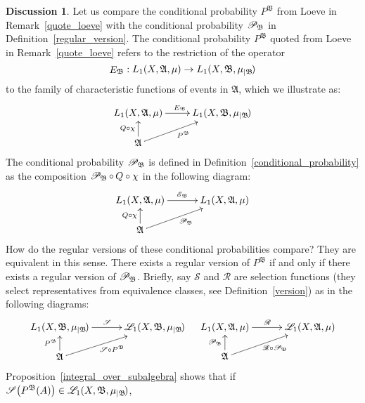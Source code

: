 \documentclass[
twoside=true,
paper=letter,
fontsize=11pt,
pagesize=auto,
leqno,
openany,
headsepline,
overfullrule,
]{scrbook}
\theoremstyle{plain}
\theoremstyle{plain}
\theoremstyle{definition}
\newtheorem{discussion}[thm]{Discussion}
\theoremstyle{bfnoteitalic}
\theoremstyle{bfnoteroman}
\newcommand{\sigalg}[1]{\mathfrak{#1}}
\newcommand{\cali}[1]{\mathscr{#1}}
\newcommand{\kondexpop}{\mathop{E}}
\newcommand{\condexpop}[1]{\mathop{\cali{E}\hspace{-1pt}}\nolimits_{#1}}
\newcommand{\condprobop}[1]{\mathop{\cali{P}\hspace{-1pt}}\nolimits_{#1}}
\newcommand{\restrictedto}[1]{_{\lvert#1}\kern-1.5pt}
\newcommand{\sigmaalgebra}{\sigalg{A}}
\newcommand{\sigmaalgebraii}{\sigalg{B}}
\newcommand{\Lone}{L_1(\measurespace, \sigmaalgebra, \measure)}
\newcommand{\caliLone}{\cali{L}_1(\measurespace, \sigmaalgebra, \measure)}
\newcommand{\measurespace}{X}
\newcommand{\measure}{\mu}
\newcommand{\seti}{A}
\newcommand{\regular}{\cali{R}}
\begin{document}
\begin{discussion}\label{regular_version_equivalence}
Let us compare the conditional probability $P^{\sigalg{B}}$ from Loeve in Remark~\ref{quote_loeve} with the conditional probability $\condprobop{\sigmaalgebraii}$ in Definition~\ref{regular_version}.  The conditional probability
$P^{\sigalg{B}}$ quoted from Loeve in Remark~\ref{quote_loeve} refers to the restriction of the operator
\[
\kondexpop\nolimits_{\sigmaalgebraii}
:
L_1(\measurespace, \sigmaalgebra,\measure) \to
L_1(\measurespace, \sigmaalgebraii,\measure\restrictedto{\sigmaalgebraii})
\]
to the family of characteristic functions of events in $\sigmaalgebra$, which we illustrate as:
\[
\xymatrix@R=16pt{
L_1(\measurespace, \sigmaalgebra,\measure )
\ar[r]^{\kondexpop\nolimits_{\sigmaalgebraii}}
&
L_1(\measurespace, \sigmaalgebraii,\measure\restrictedto{\sigmaalgebraii})
\\
\sigmaalgebra
\ar[u]^{Q\circ\chi}
\ar[ur]_{P^{\sigalg{B}}}
}
\]
The conditional probability $\condprobop{\sigmaalgebraii}$ is defined in Definition~\ref{conditional_probability} as the composition
$\condprobop{\sigmaalgebraii} \circ\, Q \circ\chi$
in the following diagram:
\[
\xymatrix@R=16pt@C=30pt{
\Lone \ar[r]^{\condexpop{\sigmaalgebraii}} & \Lone\\
\sigmaalgebra \ar[u]^{Q\circ\chi} \ar[ur]_{\condprobop{\sigmaalgebraii}} & \\
}
\]
How do the regular versions of these  conditional probabilities compare? They are equivalent in this sense.
There exists a regular version of
$P^{\sigalg{B}}$ if and only if there exists a regular version of
$\condprobop{\sigmaalgebraii}$.
Briefly, say $\cali{S}$ and $\cali{R}$ are selection functions (they select representatives from equivalence classes, see Definition~\ref{version}) as in the following diagrams:
\[
\xymatrix@R=16pt@C=30pt{
L_1(\measurespace, \sigmaalgebraii,\measure\restrictedto{\sigmaalgebraii})
\ar[r]^{\cali{S}}
& \cali{L}_1(\measurespace, \sigmaalgebraii,\measure\restrictedto{\sigmaalgebraii})
\\
\sigmaalgebra
\ar[u]^{P^{\sigmaalgebraii}}
\ar[ur]_{\cali{S}\circ P^{\sigmaalgebraii}}
&
}
\quad
\xymatrix@R=16pt@C=30pt{
\Lone \ar[r]^{\regular}
& \caliLone
\\
\sigmaalgebra
\ar[u]^{\condprobop{\sigmaalgebraii}}
\ar[ur]_{\ \regular\circ\condprobop{\sigmaalgebraii}}
&
}
\]
Proposition~\ref{integral_over_subalgebra} shows that if
$\cali{S} \bigl( P^\sigmaalgebraii (\seti) \bigr)
\in
\cali{L}_1(\measurespace, \sigmaalgebraii,\measure\restrictedto{\sigmaalgebraii})$,

\end{discussion}
\end{document}
